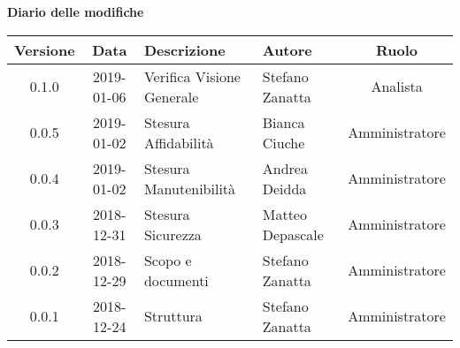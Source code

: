 	\begin{center}
		\textbf{Diario delle modifiche}
	\end{center}
	\begin{center}
		\begin{tabularx}{\textwidth}{|c|c|X|X|c|}
			\hline
			\textbf{Versione} & \textbf{Data} & \textbf{Descrizione} & \textbf{Autore} & \textbf{Ruolo} \\
			\hline
			0.1.0 & 2019-01-06 & Verifica Visione Generale & Stefano Zanatta & Analista\\
			0.0.5 & 2019-01-02 & Stesura Affidabilità & Bianca Ciuche & Amministratore\\
			0.0.4 & 2019-01-02 & Stesura Manutenibilità & Andrea Deidda & Amministratore\\
			0.0.3 & 2018-12-31 & Stesura Sicurezza & Matteo Depascale & Amministratore\\
			0.0.2 & 2018-12-29 & Scopo e documenti & Stefano Zanatta & Amministratore\\
			0.0.1 & 2018-12-24 & Struttura & Stefano Zanatta & Amministratore\\
			\hline
		\end{tabularx}
	\end{center}
\newpage
